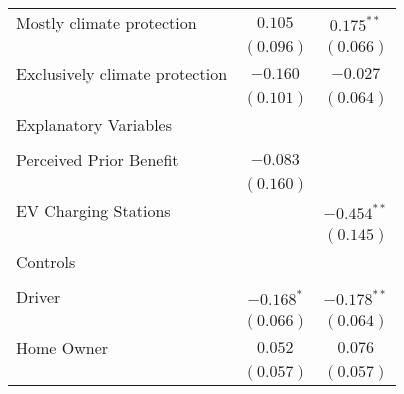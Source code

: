\begin{center}
\begin{tiny}
\begin{longtable}{l@{} c@{} c@{}}
\quad Mostly climate protection                                                      & $0.105$          & $0.175^{**}$     \\
                                                                                     & $(0.096)$        & $(0.066)$        \\
\quad Exclusively climate protection                                                 & $-0.160$         & $-0.027$         \\
                                                                                     & $(0.101)$        & $(0.064)$        \\
Explanatory Variables                                                                &                  &                  \\
                                                                                     &                  &                  \\
\quad Perceived Prior Benefit                                                        & $-0.083$         &                  \\
                                                                                     & $(0.160)$        &                  \\
\quad EV Charging Stations                                                           &                  & $-0.454^{**}$    \\
                                                                                     &                  & $(0.145)$        \\
Controls                                                                             &                  &                  \\
                                                                                     &                  &                  \\
\quad Driver                                                                         & $-0.168^{*}$     & $-0.178^{**}$    \\
                                                                                     & $(0.066)$        & $(0.064)$        \\
\quad Home Owner                                                                     & $0.052$          & $0.076$          \\
                                                                                     & $(0.057)$        & $(0.057)$        \\

\end{longtable}
\end{tiny}
\end{center}

